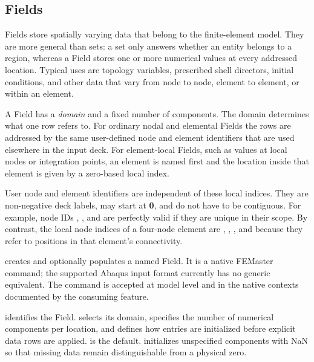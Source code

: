 \subsection{Fields}
\label{sec:fields}

Fields store spatially varying data that belong to the finite-element model. They are more general than sets: a set only answers whether an entity belongs to a region, whereas a Field stores one or more numerical values at every addressed location. Typical uses are topology variables, prescribed shell directors, initial conditions, and other data that vary from node to node, element to element, or within an element.

A Field has a \emph{domain} and a fixed number of components. The domain determines what one row refers to. For ordinary nodal and elemental Fields the rows are addressed by the same user-defined node and element identifiers that are used elsewhere in the input deck. For element-local Fields, such as values at local nodes or integration points, an element is named first and the location inside that element is given by a zero-based local index.

User node and element identifiers are independent of these local indices. They are non-negative deck labels, may start at \textbf{0}, and do not have to be contiguous. For example, node IDs , , and  are perfectly valid if they are unique in their scope. By contrast, the local node indices of a four-node element are , , , and  because they refer to positions in that element's connectivity.


 creates and optionally populates a named Field. It is a native FEMaster command; the supported Abaqus input format currently has no generic equivalent. The command is accepted at model level and in the native  contexts documented by the consuming feature.

 identifies the Field.  selects its domain,  specifies the number of numerical components per location, and  defines how entries are initialized before explicit data rows are applied.  is the default.  initializes unspecified components with NaN so that missing data remain distinguishable from a physical zero.

